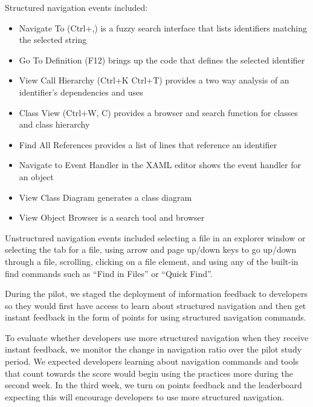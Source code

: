 \documentclass{sig-alternate}
\begin{document}
Structured navigation events included: 
\begin{itemize}[itemsep=0mm]
\item Navigate To (Ctrl+,) is a fuzzy search interface that lists identifiers matching the selected string 
\item Go To Definition (F12) brings up the code that defines the selected identifier 
\item View Call Hierarchy (Ctrl+K Ctrl+T) provides a two way analysis of an identifier's dependencies and uses
\item Class View (Ctrl+W, C) provides a browser and search function for classes and class hierarchy
\item Find All References provides a list of lines that reference an identifier
\item Navigate to Event Handler in the XAML editor shows the event handler for an object
\item View Class Diagram generates a class diagram 
\item View Object Browser is a search tool and browser
\end{itemize}

Unstructured navigation events included selecting a file in an explorer window or selecting the tab for a file, using arrow and page up/down keys to go up/down through a file, scrolling, clicking on a file element, and using any of the built-in find commands such as ``Find in Files'' or ``Quick Find''.

During the pilot, we staged the deployment of information feedback to developers so they would first have access to learn about structured navigation and then get instant feedback in the form of points for using structured navigation commands.  

To evaluate whether developers use more structured navigation when they receive instant feedback, we monitor the change in navigation ratio over the pilot study period.   We expected developers learning about navigation commands and tools that count towards the score would begin using the practices more during the second week.  In the third week, we turn on points feedback and the leaderboard expecting this will encourage developers to use more structured navigation.  
\end{document}
